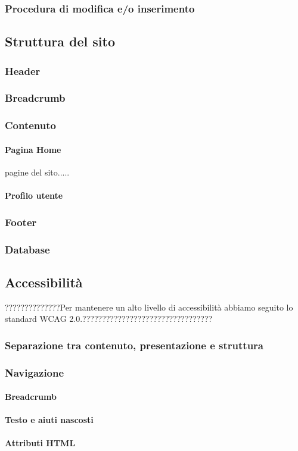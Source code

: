 \subsubsection{Procedura di modifica e/o inserimento} \label{subsection:modificainserimento}

\subsection{Struttura del sito}

\subsubsection{Header}

\subsubsection{Breadcrumb}

\subsubsection{Contenuto}

\paragraph{Pagina Home} 

pagine del sito.....

\paragraph{Profilo utente}

\subsubsection{Footer}

\subsubsection{Database}


\subsection{Accessibilità}
??????????????Per mantenere un alto livello di accessibilità abbiamo seguito lo standard WCAG 2.0.?????????????????????????????????

\subsubsection{Separazione tra contenuto, presentazione e struttura}

\subsubsection{Navigazione}

\paragraph{Breadcrumb} 

\paragraph{Testo e aiuti nascosti} 

\paragraph{Attributi HTML} 
